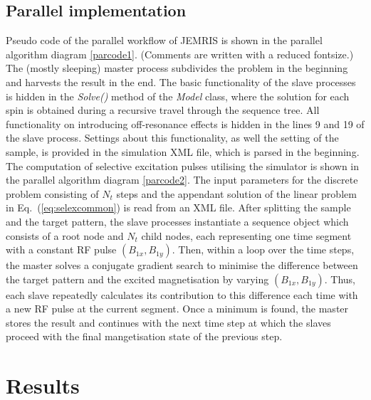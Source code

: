 \documentclass{nic-series}
\begin{document}
\subsection{Parallel implementation}
Pseudo code of the parallel workflow of JEMRIS is shown in the parallel algorithm diagram \ref{parcode1}. (Comments
are written with a reduced fontsize.) The (mostly sleeping) master process subdivides the problem
in the beginning and harvests the result in the end. The basic functionality of the slave processes is hidden
in the {\it Solve()} method of the {\it Model} class, where the solution for each spin is obtained during a recursive
travel through the sequence tree. All functionality on introducing off-resonance effects is hidden in the
lines {\footnotesize 9} and {\footnotesize 19} of the slave process. Settings about this functionality, as well the
setting of the sample, is provided in the simulation XML file, which is parsed in the \medskip beginning.\\
The computation of selective excitation pulses utilising the simulator is shown in the parallel algorithm diagram \ref{parcode2}.
The input parameters for the discrete problem consisting of $N_t$ steps and the appendant solution of the linear problem  
in Eq.~(\ref{eq:selexcommon}) is read from an XML file. After splitting the sample and the target pattern,
the slave processes instantiate a sequence object which consists of a root node and $N_t$ child nodes, each representing
one time segment with a constant RF pulse $(B_{1x},B_{1y})$. Then, within a loop over the time steps, the master solves
a conjugate gradient search to minimise the difference between the target pattern and the excited magnetisation by varying 
$(B_{1x},B_{1y})$. Thus, each slave repeatedly calculates its contribution to this difference each time with a new RF pulse
at the current segment. Once a minimum is found, the master stores the result and continues with the next time step at which the
slaves proceed with the final mangetisation state of the previous step.
\section{Results}
\end{document}
